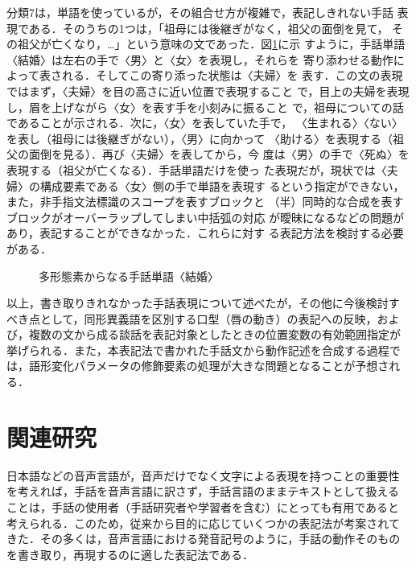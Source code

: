 分類7は，単語を使っているが，その組合せ方が複雑で，表記しきれない手話
表現である．そのうちの1つは，「祖母には後継ぎがなく，祖父の面倒を見て，
その祖父が亡くなり，…」という意味の文であった．図\ref{fig:couple}に示
すように，手話単語〈結婚〉は左右の手で〈男〉と〈女〉を表現し，それらを
寄り添わせる動作によって表される．そしてこの寄り添った状態は〈夫婦〉を
表す．この文の表現ではまず，〈夫婦〉を目の高さに近い位置で表現すること
で，目上の夫婦を表現し，眉を上げながら〈女〉を表す手を小刻みに振ること
で，祖母についての話であることが示される．次に，〈女〉を表していた手で，
〈生まれる〉〈ない〉を表し（祖母には後継ぎがない），〈男〉に向かって
〈助ける〉を表現する（祖父の面倒を見る）．再び〈夫婦〉を表してから，今
度は〈男〉の手で〈死ぬ〉を表現する（祖父が亡くなる）．手話単語だけを使っ
た表現だが，現状では〈夫婦〉の構成要素である〈女〉側の手で単語を表現す
るという指定ができない，また，非手指文法標識のスコープを表すブロックと
（半）同時的な合成を表すブロックがオーバーラップしてしまい中括弧の対応
が曖昧になるなどの問題があり，表記することができなかった．これらに対す
る表記方法を検討する必要がある．
\begin{figure}
  \centering
  \epsfxsize=3.5cm
  \caption{多形態素からなる手話単語〈結婚〉}
  \label{fig:couple}
\end{figure}

以上，書き取りきれなかった手話表現について述べたが，その他に今後検討す
べき点として，同形異義語を区別する口型（唇の動き）の表記への反映，およ
び，複数の文から成る談話を表記対象としたときの位置変数の有効範囲指定が
挙げられる．また，本表記法で書かれた手話文から動作記述を合成する過程で
は，語形変化パラメータの修飾要素の処理が大きな問題となることが予想され
る．

\section{関連研究}

日本語などの音声言語が，音声だけでなく文字による表現を持つことの重要性
を考えれば，手話を音声言語に訳さず，手話言語のままテキストとして扱える
ことは，手話の使用者（手話研究者や学習者を含む）にとっても有用であると
考えられる．このため，従来から目的に応じていくつかの表記法が考案されて
きた．その多くは，音声言語における発音記号のように，手話の動作そのもの
を書き取り，再現するのに適した表記法である．

